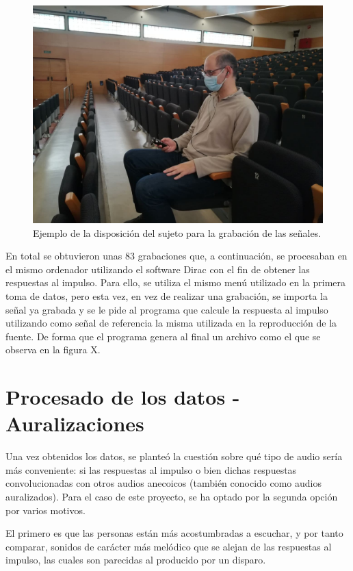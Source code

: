 \documentclass[11pt,a4paper,twoside]{book}
\begin{document}
            \begin{figure}
                \includegraphics[scale=0.3]{../imagenes/Nico.jpg}
                \centering
                \caption{Ejemplo de la disposición del sujeto para la grabación de las señales.}
                \label{fig:Nico}
            \end{figure}
                
            En total se obtuvieron unas 83 grabaciones que, a continuación, se procesaban en el mismo ordenador utilizando el software Dirac con el fin de obtener las respuestas al impulso. Para ello, se utiliza el mismo menú utilizado en la primera toma de datos, pero esta vez, en vez de realizar una grabación, se importa la señal ya grabada y se le pide al programa que calcule la respuesta al impulso utilizando como señal de referencia la misma utilizada en la reproducción de la fuente. De forma que el programa genera al final un archivo como el que se observa en la figura X.

        
    \section{Procesado de los datos - Auralizaciones}
        Una vez obtenidos los datos, se planteó la cuestión sobre qué tipo de audio sería más conveniente: si las respuestas al impulso o bien dichas respuestas convolucionadas con otros audios anecoicos (también conocido como audios auralizados). Para el caso de este proyecto, se ha optado por la segunda opción por varios motivos.
        
        El primero es que las personas están más acostumbradas a escuchar, y por tanto comparar, sonidos de carácter más melódico que se alejan de las respuestas al impulso, las cuales son parecidas al producido por un disparo.
        
\end{document}

